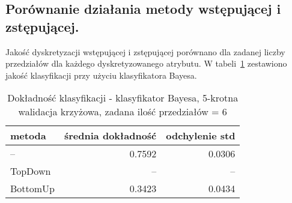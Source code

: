 \subsection{Porównanie działania metody wstępującej i zstępującej.}
Jakość dyskretyzacji wstępującej i zstępującej porównano dla zadanej liczby przedziałów dla każdego dyskretyzowanego atrybutu. W tabeli~\ref{tab:bayes_td_bu_comp_full_set} zestawiono jakość klasyfikacji przy użyciu klasyfikatora Bayesa.

\begin{table}[h!]
\begin{center}
\begin{tabular}{lrr}
\toprule
metoda & średnia dokładność & odchylenie std \\
\midrule
--      & 0.7592	& 0.0306 \\
TopDown & --		& --	\\
BottomUp& 0.3423	& 0.0434	\\
\bottomrule
\end{tabular}
\caption{Dokładność klasyfikacji - klasyfikator Bayesa, 5-krotna walidacja krzyżowa, zadana ilość przedziałów = 6}
\label{tab:bayes_td_bu_comp_full_set}
\end{center}
\end{table}

